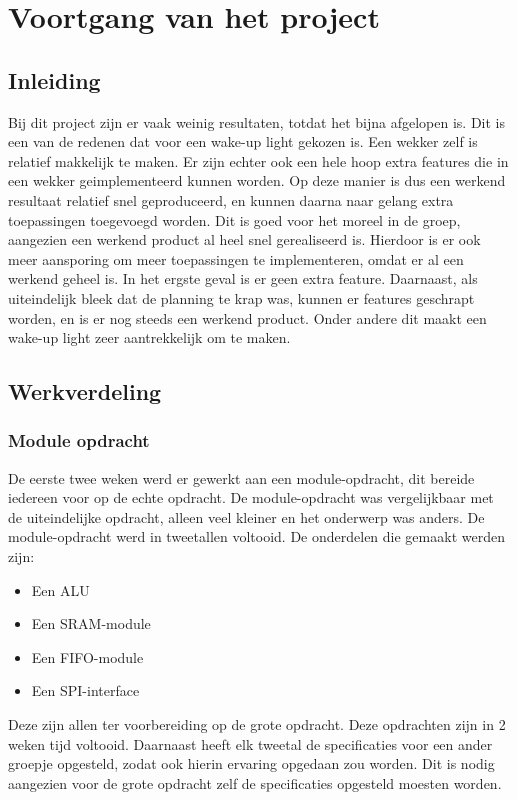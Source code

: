 \chapter{Voortgang van het project}

\section{Inleiding}
Bij dit project zijn er vaak weinig resultaten, totdat het bijna afgelopen is. 
Dit is een van de redenen dat voor een wake-up light gekozen is.
Een wekker zelf is relatief makkelijk te maken. 
Er zijn echter ook een hele hoop extra features die in een wekker geimplementeerd kunnen worden. 
Op deze manier is dus een werkend resultaat relatief snel geproduceerd, en kunnen daarna naar gelang extra toepassingen toegevoegd worden. 
Dit is goed voor het moreel in de groep, aangezien een werkend product al heel snel gerealiseerd is.
Hierdoor is er ook meer aansporing om meer toepassingen te implementeren, omdat er al een werkend geheel is. 
In het ergste geval is er geen extra feature.
Daarnaast, als uiteindelijk bleek dat de planning te krap was, kunnen er features geschrapt worden, en is er nog steeds een werkend product. 
Onder andere dit maakt een wake-up light zeer aantrekkelijk om te maken.

\section{Werkverdeling}
\subsection{Module opdracht}
De eerste twee weken werd er gewerkt aan een module-opdracht, dit bereide iedereen voor op de echte opdracht. 
De module-opdracht was vergelijkbaar met de uiteindelijke opdracht, alleen veel kleiner en het onderwerp was anders.
De module-opdracht werd in tweetallen voltooid. De onderdelen die gemaakt werden zijn:
\begin{itemize}[nolistsep]
	\item Een ALU
	\item Een SRAM-module
	\item Een FIFO-module
	\item Een SPI-interface
\end{itemize}
Deze zijn allen ter voorbereiding op de grote opdracht. Deze opdrachten zijn in 2 weken tijd voltooid. 
Daarnaast heeft elk tweetal de specificaties voor een ander groepje opgesteld, zodat ook hierin ervaring opgedaan zou worden.
Dit is nodig aangezien voor de grote opdracht zelf de specificaties opgesteld moesten worden. 

